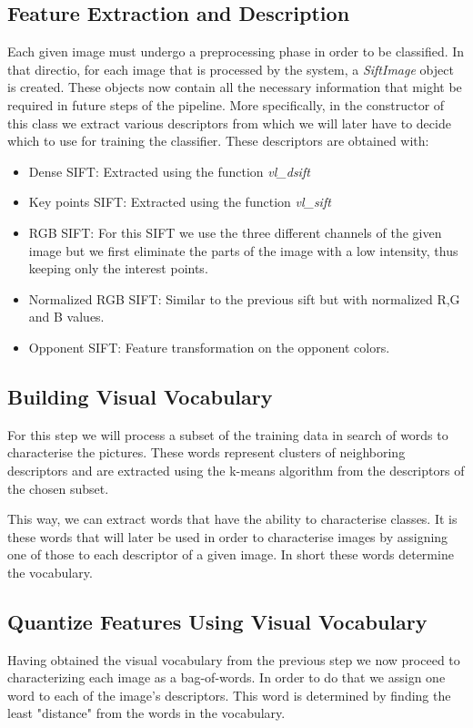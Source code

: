 \documentclass[11pt]{article}
\begin{document}
\subsection{Feature Extraction and Description}
Each given image must undergo a preprocessing phase in order to be classified. In that directio, for each image that is processed by the system, a \emph{SiftImage} object is created. These objects now contain all the necessary information that might be required in future steps of the pipeline. More specifically, in the constructor of this class we extract various descriptors from which we will later have to decide which to use for training the classifier. These descriptors are obtained with:
\begin{itemize}
\item Dense SIFT: Extracted using the function \emph{vl\_dsift}\cite{vedaldi08vlfeat}
\item Key points SIFT: Extracted using the function \emph{vl\_sift}\cite{vedaldi08vlfeat}
\item RGB SIFT: For this SIFT we use the three different channels of the given image but we first eliminate the parts of the image with a low intensity, thus keeping only the interest points.
\item Normalized RGB SIFT: Similar to the previous sift but with normalized R,G and B values.
\item Opponent SIFT: Feature transformation on the opponent colors.
\end{itemize}

\subsection{Building Visual Vocabulary}
For this step we will process a subset of the training data in search of words to characterise the pictures. These words represent clusters of neighboring descriptors and are extracted using the k-means algorithm \cite{vedaldi08vlfeat} from the descriptors of the chosen subset.

This way, we can extract words that have the ability to characterise classes. It is these words that will later be used in order to characterise images by assigning one of those to each descriptor of a given image. In short these words determine the vocabulary.

\subsection{Quantize Features Using Visual Vocabulary}
Having obtained the visual vocabulary from the previous step we now proceed to characterizing each image as a bag-of-words. In order to do that we assign one word to each of the image's descriptors. This word is determined by finding the least "distance" from the words in the vocabulary.
\end{document}

